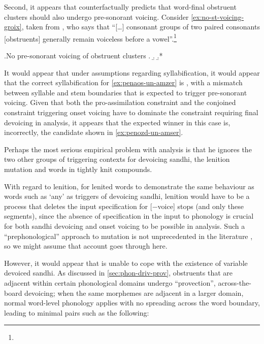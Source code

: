Second, it appears that \citet{kramer-breton} counterfactually predicts that word\hyp final obstruent clusters should also undergo pre\hyp sonorant voicing. Consider \cref{ex:no-st-voicing-groix}, taken from \citet[p.~98]{Ter70}, who says that \enquote{[\ldots] consonant groups of two paired consonants [\ie obstruents] generally remain voiceless before a vowel}.\footnote{}

\ex.\label{ex:no-st-voicing-groix}No pre\hyp sonorant voicing of obstruent clusters
\a.
\b.\label{ex:penaos-un-amzer}
\b.*\label{ex:penozd-un-amser}

It would appear that under  assumptions regarding syllabification, it would appear that the correct syllabification for \cref{ex:penaos-un-amzer} is , with a mismatch between syllable and stem boundaries that is expected to trigger pre\hyp sonorant voicing. Given that both the pro\hyp assimilation constraint and the conjoined constraint triggering onset voicing have to dominate the constraint requiring final devoicing in  analysis, it appears that the expected winner in this case is, incorrectly, the candidate shown in \cref{ex:penozd-un-amser}.

Perhaps the most serious empirical problem with  analysis is that he ignores the two other groups of triggering contexts for devoicing sandhi, \ie the lenition mutation and words in tightly knit compounds.

With regard to lenition, for lenited words to demonstrate the same behaviour as words such as \ipa{[bəˈnak]} `any' as triggers of devoicing sandhi, lenition would have to be a process that deletes the input specification for [$-$voice] stops (and only these segments), since the absence of specification in the input to phonology is crucial for both sandhi devoicing and onset voicing to be possible in  analysis. Such a \enquote{prephonological} approach to mutation is not unprecedented in the literature \citep[\cf \eg][]{hayes90,stewart,green2003,greenbook}, so we might assume that  account goes through here.

However, it would appear that \citet{kramer-breton} is unable to cope with the existence of variable devoiced sandhi. As discussed in \cref{sec:phon-driv-prov}, obstruents that are adjacent within certain phonological domains undergo \enquote{provection}, \ie across\hyp the\hyp board devoicing; when the same morphemes are adjacent in a larger domain, normal word\hyp level phonology applies with no spreading across the word boundary, leading to minimal pairs such as the following:

